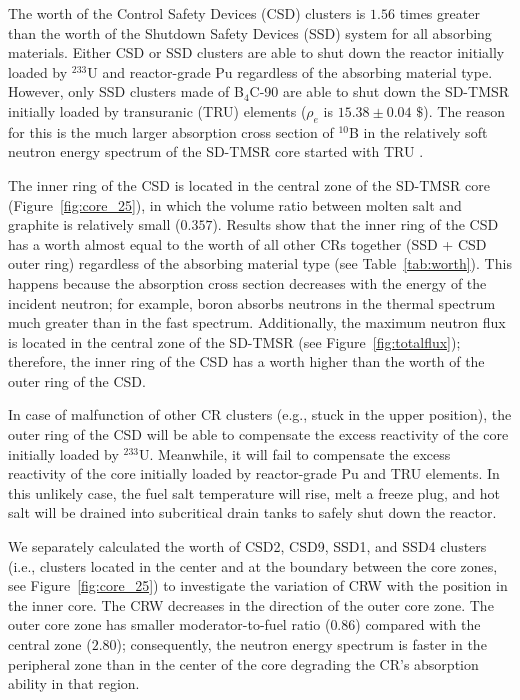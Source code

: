 The worth of the Control Safety Devices (CSD) clusters is $1.56$ times greater than 
the worth of the Shutdown Safety Devices (SSD) system for all absorbing materials. Either CSD or SSD 
clusters are able to shut down the reactor initially loaded by 
$^{233}$U and reactor-grade Pu regardless of the absorbing material type.
However, only SSD clusters made of B$_4$C-90 are able to shut down the SD-TMSR 
initially loaded by transuranic (TRU) elements ($\rho_e$ is $15.38\pm0.04$ $\$$).
The reason for this is the much larger 
absorption cross section of $^{10}$B in the relatively soft neutron energy 
spectrum of the SD-TMSR core started with TRU \cite{ashraf2020Strategies}.

The inner ring of the CSD is located in the central zone of the SD-TMSR core 
(Figure~\ref{fig:core_25}), in which the volume ratio between molten salt and 
graphite is relatively small ($0.357$). Results show that the inner ring of the CSD has 
a worth almost equal to the worth of all other CRs together (SSD + CSD outer ring) regardless of 
the absorbing material type (see Table~\ref{tab:worth}). This happens because the absorption cross section
decreases with the energy of the incident neutron; for example, boron absorbs neutrons in the thermal spectrum much 
greater than in the fast spectrum. Additionally, the maximum neutron flux is located in the central zone of the SD-TMSR (see Figure~\ref{fig:totalflux}); therefore, the inner ring of the CSD has a worth higher than the worth of the outer ring of the CSD.

In case of malfunction of other CR clusters (e.g., stuck in the upper 
position), the outer ring of the CSD will be able to compensate the excess reactivity of the core initially loaded by $^{233}$U.
Meanwhile, it will fail to compensate the excess 
reactivity of the core initially loaded by reactor-grade Pu and TRU elements. In this unlikely case, the fuel salt temperature will rise, melt a freeze plug, and hot salt will be drained into subcritical drain tanks to safely shut down the reactor.

We separately calculated the worth of CSD2, CSD9, SSD1, and SSD4 clusters (i.e., clusters located in the center and at the boundary between the core
zones, see Figure~\ref{fig:core_25}) to investigate the variation of CRW with the position in the inner core.
The CRW decreases in the direction of the outer core zone. The outer core zone 
has smaller moderator-to-fuel ratio ($0.86$) compared with the central zone 
($2.80$); consequently, the neutron energy spectrum is faster in the peripheral 
zone than in the center of the core degrading the CR's 
absorption ability in that region.

